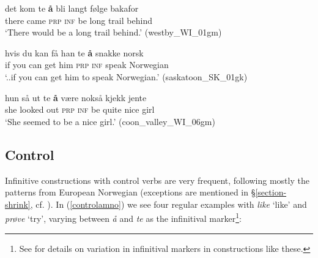 \documentclass[output=paper,colorlinks,citecolor=brown]{langscibook}
\begin{document}
\begin{exe} 

\item \label{raisingamno}

\begin{xlist}


\item \label{raising1} \gll det kom te \textbf{{\aa}} bli langt følge bakafor \\
        there came \textsc{prp} \textsc{inf} be long trail behind \\
         \glt `There would be a long trail behind.' \hfill(westby\_WI\_01gm)

\item \label{raising2} \gll hvis du kan få han te \textbf{{\aa}} snakke norsk \\
        if you can get him \textsc{prp} \textsc{inf} speak Norwegian \\
         \glt `..if you can get him to speak Norwegian.' \hfill(saskatoon\_SK\_01gk)

\item \label{raising3} \gll hun så ut te \textbf{{\aa}} være nokså kjekk jente \\
        she looked out \textsc{prp} \textsc{inf} be quite nice girl \\
         \glt `She seemed to be a nice girl.' \hfill(coon\_valley\_WI\_06gm)

\end{xlist}
\end{exe}




\subsection{Control} \label{control}

Infinitive constructions with control verbs are very frequent, following mostly the patterns from European Norwegian (exceptions are mentioned in §\ref{section-shrink}, cf. \cite{putsoft}). In (\ref{controlamno}) we see four regular examples with \textit{like} `like' and \textit{prøve} `try', varying between \textit{\aa} and \textit{te} as the infinitival marker\footnote{See \citet{putsoft} for details on variation in infinitival markers in constructions like these.}: 
\end{document}
